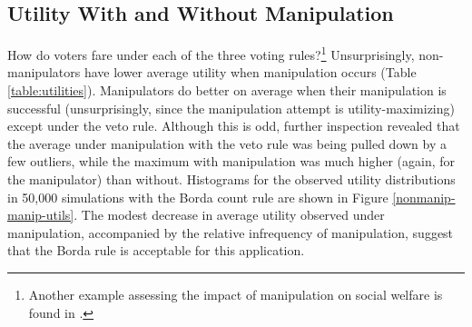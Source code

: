 \documentclass[12pt,letterpaper]{article} %
\begin{document}
\subsection{Utility With and Without Manipulation}

How do voters fare under each of the three voting rules?\footnote{Another example assessing the impact of manipulation on social welfare is found in \cite{lu2012bayesian}.} Unsurprisingly, non-manipulators have lower average utility when manipulation occurs (Table \ref{table:utilities}). Manipulators do better on average when their manipulation is successful (unsurprisingly, since the manipulation attempt is utility-maximizing) except under the veto rule. Although this is odd, further inspection revealed that the average under manipulation with the veto rule was being pulled down by a few outliers, while the maximum with manipulation was much higher (again, for the manipulator) than without. Histograms for the observed utility distributions in 50,000 simulations with the Borda count rule are shown in Figure \ref{nonmanip-manip-utils}. The modest decrease in average utility observed under manipulation, accompanied by the relative infrequency of manipulation, suggest that the Borda rule is acceptable for this application. 


\end{document}

